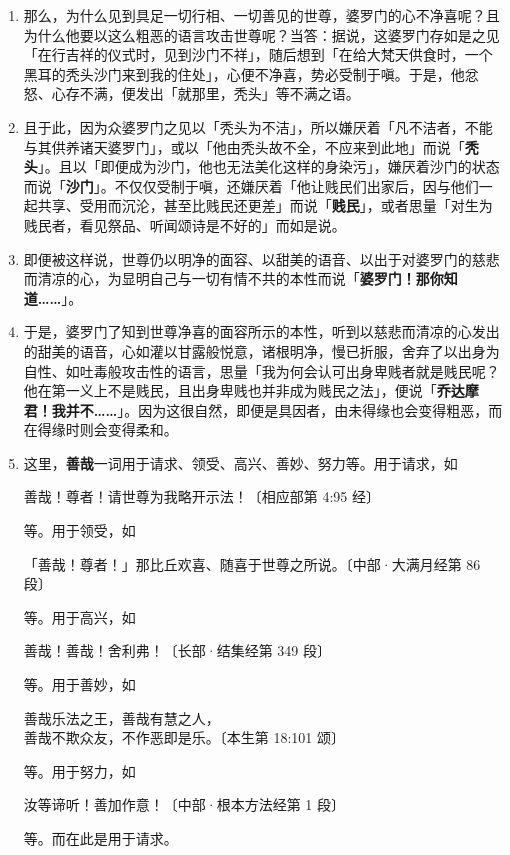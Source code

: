\begin{enumerate}\item 那么，为什么见到具足一切行相、一切善见的世尊，婆罗门的心不净喜呢？且为什么他要以这么粗恶的语言攻击世尊呢？当答：据说，这婆罗门存如是之见「在行吉祥的仪式时，见到沙门不祥」，随后想到「在给大梵天供食时，一个黑耳的秃头沙门来到我的住处」，心便不净喜，势必受制于嗔。于是，他忿怒、心存不满，便发出「就那里，秃头」等不满之语。
\item 且于此，因为众婆罗门之见以「秃头为不洁」，所以嫌厌着「凡不洁者，不能与其供养诸天婆罗门」，或以「他由秃头故不全，不应来到此地」而说「\textbf{秃头}」。且以「即便成为沙门，他也无法美化这样的身染污」，嫌厌着沙门的状态而说「\textbf{沙门}」。不仅仅受制于嗔，还嫌厌着「他让贱民们出家后，因与他们一起共享、受用而沉沦，甚至比贱民还更差」而说「\textbf{贱民}」，或者思量「对生为贱民者，看见祭品、听闻颂诗是不好的」而如是说。
\item 即便被这样说，世尊仍以明净的面容、以甜美的语音、以出于对婆罗门的慈悲而清凉的心，为显明自己与一切有情不共的本性而说「\textbf{婆罗门！那你知道……}」。
\item 于是，婆罗门了知到世尊净喜的面容所示的本性，听到以慈悲而清凉的心发出的甜美的语音，心如灌以甘露般悦意，诸根明净，慢已折服，舍弃了以出身为自性、如吐毒般攻击性的语言，思量「我为何会认可出身卑贱者就是贱民呢？他在第一义上不是贱民，且出身卑贱也并非成为贱民之法」，便说「\textbf{乔达摩君！我并不……}」。因为这很自然，即便是具因者，由未得缘也会变得粗恶，而在得缘时则会变得柔和。
\item 这里，\textbf{善哉}一词用于请求、领受、高兴、善妙、努力等。用于请求，如\begin{quoting}善哉！尊者！请世尊为我略开示法！{\bluefootnotesize 〔相应部第 4:95 经〕}\end{quoting}等。用于领受，如\begin{quoting}「善哉！尊者！」那比丘欢喜、随喜于世尊之所说。{\bluefootnotesize 〔中部·大满月经第 86 段〕}\end{quoting}等。用于高兴，如\begin{quoting}善哉！善哉！舍利弗！{\bluefootnotesize 〔长部·结集经第 349 段〕}\end{quoting}等。用于善妙，如\begin{quoting}善哉乐法之王，善哉有慧之人，\\善哉不欺众友，不作恶即是乐。{\bluefootnotesize 〔本生第 18:101 颂〕}\end{quoting}等。用于努力，如\begin{quoting}汝等谛听！善加作意！{\bluefootnotesize 〔中部·根本方法经第 1 段〕}\end{quoting}等。而在此是用于请求。

\end{enumerate}
